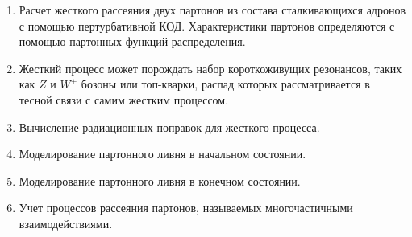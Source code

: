 \begin{enumerate}
	\item Расчет жесткого рассеяния двух партонов из состава сталкивающихся адронов с помощью пертурбативной КОД. Характеристики партонов определяются с помощью партонных функций распределения.
	
	\item Жесткий процесс может порождать набор короткоживущих резонансов, таких как $Z$ и $W^\pm$ бозоны или топ-кварки, распад которых рассматривается в тесной связи с самим жестким процессом. 
	
	\item Вычисление радиационных поправок для жесткого процесса. %
	
	\item Моделирование партонного ливня в начальном состоянии.
	
	\item Моделирование партонного ливня в конечном состоянии.
	
	\item Учет процессов рассеяния партонов, называемых многочастичными взаимодействиями. %
	
	

\end{enumerate}
